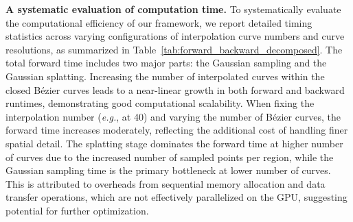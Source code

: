 \noindent\textbf{A systematic evaluation of computation time.} To systematically evaluate the computational efficiency of our framework, we report detailed timing statistics across varying configurations of interpolation curve numbers and curve resolutions, as summarized in Table~\ref{tab:forward_backward_decomposed}. The total forward time includes two major parts: the Gaussian sampling and the Gaussian splatting. Increasing the number of interpolated curves within the closed Bézier curves leads to a near-linear growth in both forward and backward runtimes, demonstrating good computational scalability. When fixing the interpolation number (\textit{e.g.}, at 40) and varying the number of Bézier curves, the forward time increases moderately, reflecting the additional cost of handling finer spatial detail. The splatting stage dominates the forward time at higher number of curves due to the increased number of sampled points per region, while the Gaussian sampling time is the primary bottleneck at lower number of curves. This is attributed to overheads from sequential memory allocation and data transfer operations, which are not effectively parallelized on the GPU, suggesting potential for further optimization.

\begin{table}[!t]
\centering
\caption{A systematic evaluation of computation time. We test the forward and backward time (ms) under varying numbers of sampled curves within one closed Bézier curve (Inter. \#), and the total number of Bézier curves (Curve \#).}
\label{tab:forward_backward_decomposed}
\end{table}

